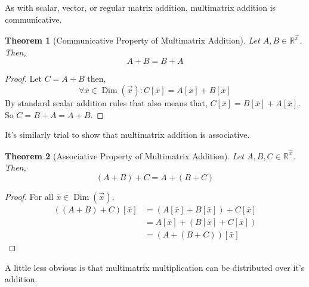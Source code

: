 \documentclass[12pt]{article}
\theoremstyle{definition}
\theoremstyle{plain}
\newtheorem{theorem}{Theorem}[section]
\theoremstyle{ppart}
\DeclareMathOperator{\Dim}{Dim}
\begin{document}
As with scalar, vector, or regular matrix addition, multimatrix addition is
communicative. 
\begin{theorem}[Communicative Property of Multimatrix Addition]
Let $A, B \in \mathbb{R}^{\vec{x}}$. Then,
\[ A + B = B + A \]
\end{theorem}
\begin{proof}
Let $C = A + B$ then,
\[ \forall \bar{x} \in \Dim(\vec{x}) : C[\bar{x}] = A[\bar{x}] + B[\bar{x}] \]
By standard scalar addition rules that also means that,
$C[\bar{x}] = B[\bar{x}] + A[\bar{x}]$. So $C = B + A = A + B$.
\end{proof}

It's similarly trial to show that multimatrix addition is associative.

\begin{theorem}[Associative Property of Multimatrix Addition]
Let $A, B, C \in \mathbb{R}^{\vec{x}}$. Then,
\[ (A + B) + C = A + (B + C) \]
\end{theorem}
\begin{proof}
For all $\bar{x} \in \Dim(\vec{x})$,
\begin{align*}
\left( (A+B)+C \right)[\bar{x}]
&= (A[\bar{x}]+B[\bar{x}])+C[\bar{x}] \\
&= A[\bar{x}]+(B[\bar{x}]+C[\bar{x}]) \\
&= \left( A+(B+C) \right)[\bar{x}]
\end{align*}
\end{proof}

A little less obvious is that multimatrix multiplication can be distributed over
it's addition.
\end{document}
